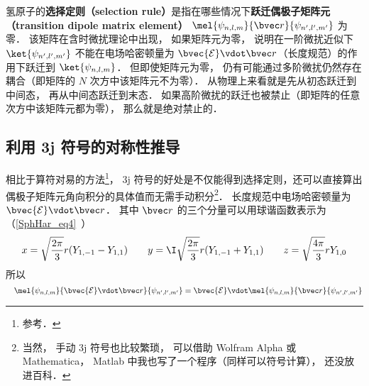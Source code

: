 

氢原子的\textbf{选择定则（selection rule）}是指在哪些情况下\textbf{跃迁偶极子矩阵元（transition dipole matrix element）} $\mel{\psi_{n,l,m}}{\bvec r}{\psi_{n',l',m'}}$ 为零． 该矩阵在含时微扰理论中出现， 如果矩阵元为零， 说明在一阶微扰近似下 $\ket{\psi_{n',l',m'}}$ 不能在电场哈密顿量为 $\bvec{\mathcal{E}}\vdot \bvec r$（长度规范）的作用下跃迁到 $\ket{\psi_{n,l,m}}$． 但即使矩阵元为零， 仍有可能通过多阶微扰仍然存在耦合（即矩阵的 $N$ 次方中该矩阵元不为零）． 从物理上来看就是先从初态跃迁到中间态， 再从中间态跃迁到末态． 如果高阶微扰的跃迁也被禁止（即矩阵的任意次方中该矩阵元都为零）， 那么就是绝对禁止的． %

\subsection{利用 3j 符号的对称性推导}
相比于算符对易的方法\footnote{参考\cite{GriffQ}．}， 3j 符号的好处是不仅能得到选择定则，还可以直接算出偶极子矩阵元角向积分的具体值而无需手动积分\footnote{当然， 手动 3j 符号也比较繁琐， 可以借助 Wolfram Alpha 或 Mathematica， Matlab 中我也写了一个程序（同样可以符号计算）， 还没放进百科．}． 长度规范中电场哈密顿量为 $\bvec{\mathcal{E}}\vdot \bvec r$． 其中 $\bvec r$ 的三个分量可以用球谐函数表示为（\autoref{SphHar_eq4}~）
\begin{equation}
x = \sqrt{\frac{2\pi}{3}} r (Y_{1,-1} - Y_{1,1}) \qquad
y = \I \sqrt{\frac{2\pi}{3}} r (Y_{1,-1}+Y_{1,1}) \qquad
z = \sqrt{\frac{4\pi}{3}} rY_{1,0}
\end{equation}
所以
\begin{equation}\label{SelRul_eq3}
\quad\mel{\psi_{n,l,m}}{\bvec{\mathcal E}\vdot\bvec r}{\psi_{n',l',m'}} = \bvec{\mathcal E}\vdot\mel{\psi_{n,l,m}}{\bvec r}{\psi_{n',l',m'}}
\end{equation}

